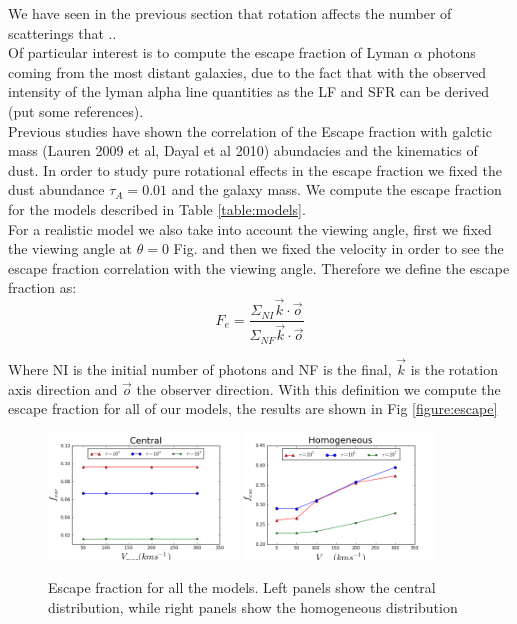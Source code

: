 \documentclass[usenatbib]{mn2e}
\begin{document}
We have seen in the previous section that rotation affects the number
of scatterings that ..\\

Of particular interest is to compute the escape fraction of Lyman $\alpha$ photons coming from the most distant galaxies, due to the fact that with the observed intensity of the lyman alpha line quantities as the LF and SFR can be derived (put some references). \\

Previous studies have shown the correlation of the Escape fraction with galctic mass (Lauren 2009 et al, Dayal et al 2010) abundacies and the kinematics of dust. In order to study pure rotational effects in the escape fraction we fixed the dust abundance $\tau_{A}=0.01$ and the galaxy mass. We compute the escape fraction for the models described in Table \ref{table:models}.\\

For a realistic model we also take into account the viewing angle, first we fixed the viewing angle at $\theta = 0$  Fig. and then we fixed the velocity in order to see the escape fraction correlation with the viewing angle. Therefore we define the escape fraction as:\\ 

\begin{equation}
F_{e}=\dfrac{\Sigma_{NI} \vec{k}\cdot \vec{o}}{\Sigma_{NF}\vec{k}\cdot \vec{o}}
\end{equation}

Where NI is the initial number of photons and NF is the final,
$\vec{k}$ is the rotation axis direction and $\vec{o}$ the observer
direction. With this definition we compute the escape fraction for all
of our models, the results are shown in Fig \ref{figure:escape}\\  
 
\begin{figure}
  \includegraphics[width=0.45\textwidth]{FECENTRAL.png}
  \includegraphics[width=0.45\textwidth]{FEHOMOGENEOUS.png}
   \label{figure:efvsv}\caption{Escape fraction for all the models. Left
    panels show the central distribution, while right panels show the
    homogeneous distribution} 
\end{figure}
\end{document}
